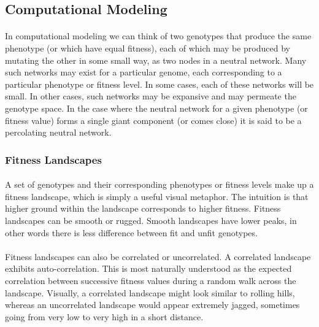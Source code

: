 \documentclass[12pt,letterpaper,titlepage,draft]{article}
\begin{document}
\subsection{Computational Modeling}

\paragraph{}
In computational modeling we can think of two genotypes that produce the same
phenotype (or which have equal fitness), each of which may be produced by
mutating the other in some small way, as two nodes in a neutral network. Many
such networks may exist for a particular genome, each corresponding to a
particular phenotype or fitness level. In some cases, each of these networks
will be small. In other cases, such networks may be expansive and may permeate
the genotype space. In the case where the neutral network for a given phenotype
(or fitness value) forms a single giant component (or comes close) it is said
to be a percolating neutral network.

\subsubsection{Fitness Landscapes}

\paragraph{}
A set of genotypes and their corresponding phenotypes or fitness levels make up
a fitness landscape, which is simply a useful visual metaphor. The intuition is
that higher ground within the landscape corresponds to higher fitness. Fitness
landscapes can be smooth or rugged. Smooth landscapes have lower peaks, in
other words there is less difference between fit and unfit genotypes.

\paragraph{}
Fitness landscapes can also be correlated or uncorrelated. A correlated
landscape exhibits auto-correlation. This is most naturally understood as the
expected correlation between successive fitness values during a random walk
across the landscape. Visually, a correlated landscape might look similar to
rolling hills, whereas an uncorrelated landscape would appear extremely jagged,
sometimes going from very low to very high in a short distance.
\end{document}
